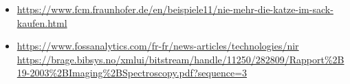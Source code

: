 \documentclass[12pt,a4paper]{article}
\begin{document}
\begin{itemize}
	\item \href{https://www.fcm.fraunhofer.de/en/beispiele11/nie-mehr-die-katze-im-sack-kaufen.html}{https://www.fcm.fraunhofer.de/en/beispiele11/nie-mehr-die-katze-im-sack-kaufen.html}
	\item \href{https://www.fossanalytics.com/fr-fr/news-articles/technologies/nir}{https://www.fossanalytics.com/fr-fr/news-articles/technologies/nir}
	\href{https://brage.bibsys.no/xmlui/bitstream/handle/11250/282809/Rapport\%2B19-2003\%2BImaging\%2BSpectroscopy.pdf?sequence=3}{https://brage.bibsys.no/xmlui/bitstream/handle/11250/282809/Rapport\%2B19-2003\%2BImaging\%2BSpectroscopy.pdf?sequence=3}
\end{itemize}
\end{document}
